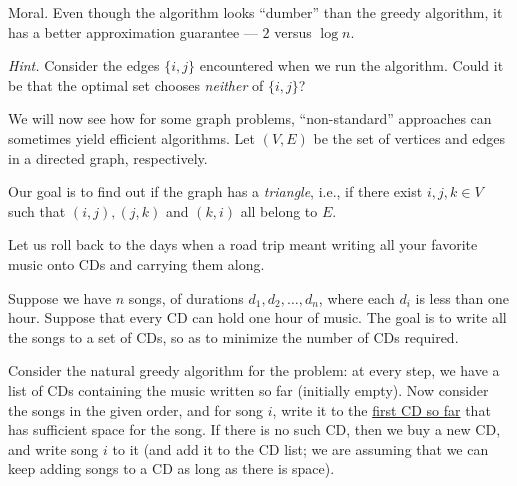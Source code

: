 \documentclass[addpoints, 11pt]{exam}
\begin{document}
\begin{questions}
\begin{parts}
{\sc Moral.}  Even though the algorithm looks ``dumber'' than the greedy algorithm, it has a better approximation guarantee --- $2$ versus $\log n$.
\end{parts}

{\em Hint.} Consider the edges $\{i,j\}$ encountered when we run the algorithm. Could it be that the optimal set chooses {\em neither} of $\{i,j\}$?

We will now see how for some graph problems, ``non-standard'' approaches can sometimes yield efficient algorithms. Let $(V, E)$ be the set of vertices and edges in a directed graph, respectively. 

Our goal is to find out if the graph has a {\em triangle}, i.e., if there exist $i,j, k \in V$ such that $(i,j), (j,k)$ and $(k,i)$ all belong to $E$. 

\newcommand{\opt}{\textsc{Opt}}
Let us roll back to the days when a road trip meant writing all your favorite music onto CDs and carrying them along.

Suppose we have $n$ songs, of durations $d_1, d_2, \dots, d_n$, where each $d_i$ is less than one hour. Suppose that every CD can hold one hour of music. The goal is to write all the songs to a set of CDs, so as to minimize the number of CDs required.

Consider the natural greedy algorithm for the problem: at every step, we have a list of CDs containing the music written so far (initially empty). Now consider the songs in the given order, and for song $i$, write it to the \underline{first CD so far} that has sufficient space for the song. If there is no such CD, then we buy a new CD, and write song $i$ to it (and add it to the CD list; we are assuming that we can keep adding songs to a CD as long as there is space).


\end{questions}
\end{document}
